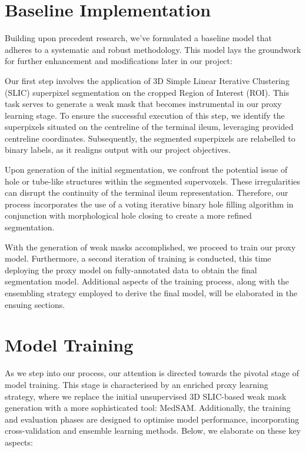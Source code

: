 \section{Baseline Implementation}

Building upon precedent research, we've formulated a baseline model that adheres to a systematic and robust methodology. This model lays the groundwork for further enhancement and modifications later in our project:

Our first step involves the application of 3D Simple Linear Iterative Clustering (SLIC) superpixel segmentation on the cropped Region of Interest (ROI). This task serves to generate a weak mask that becomes instrumental in our proxy learning stage. To ensure the successful execution of this step, we identify the superpixels situated on the centreline of the terminal ileum, leveraging provided centreline coordinates. Subsequently, the segmented superpixels are relabelled to binary labels, as it realigns output with our project objectives.

Upon generation of the initial segmentation, we confront the potential issue of hole or tube-like structures within the segmented supervoxels. These irregularities can disrupt the continuity of the terminal ileum representation. Therefore, our process incorporates the use of a voting iterative binary hole filling algorithm in conjunction with morphological hole closing to create a more refined segmentation.

With the generation of weak masks accomplished, we proceed to train our proxy model. Furthermore, a second iteration of training is conducted, this time deploying the proxy model on fully-annotated data to obtain the final segmentation model. Additional aspects of the training process, along with the ensembling strategy employed to derive the final model, will be elaborated in the ensuing sections.

\section{Model Training}
As we step into our process, our attention is directed towards the pivotal stage of model training. This stage is characterised by an enriched proxy learning strategy, where we replace the initial unsupervised 3D SLIC-based weak mask generation with a more sophisticated tool: MedSAM. Additionally, the training and evaluation phases are designed to optimise model performance, incorporating cross-validation and ensemble learning methods. Below, we elaborate on these key aspects:

